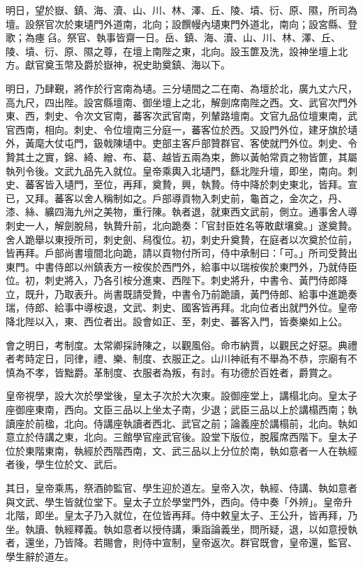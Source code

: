 \begin{pinyinscope}
 明日，望於嶽、鎮、海、瀆、山、川、林、澤、丘、陵、墳、衍、原、隰，所司為壇。設祭官次於東壝門外道南，北向；設饌幔內壝東門外道北，南向；設宮縣、登歌；為瘞臽。祭官、執事皆齋一日。岳、鎮、海、瀆、山、川、林、澤、丘、陵、墳、衍、原、隰之尊，在壇上南陛之東，北向。設玉篚及洗，設神坐壇上北方。獻官奠玉幣及爵於嶽神，祝史助奠鎮、海以下。



 明日，乃肆覲，將作於行宮南為壝。三分壝間之二在南、為壇於北，廣九丈六尺，高九尺，四出陛。設宮縣壇南、御坐壇上之北，解劍席南陛之西。文、武官次門外東、西，刺史、令次文官南，蕃客次武官南，列輦路壇南。文官九品位壇東南，武官西南，相向。刺史、令位壇南三分庭一，蕃客位於西。又設門外位，建牙旗於壝外，黃麾大仗屯門，鈒戟陳壝中。吏部主客戶部贊群官、客使就門外位。刺史、令贄其土之實，錦、綺、繒、布、葛、越皆五兩為束，飾以黃帕常貢之物皆篚，其屬執列令後。文武九品先入就位。皇帝乘輿入北壝門，繇北陛升壇，即坐，南向。刺史、蕃客皆入壝門，至位，再拜，奠贄，興，執贄。侍中降於刺史東北，皆拜。宣已，又拜。蕃客以舍人稱制如之。戶部導貢物入刺史前，龜首之，金次之，丹、漆、絲、纊四海九州之美物，重行陳。執者退，就東西文武前，側立。通事舍人導刺史一人，解劍脫舄，執贄升前，北向跪奏：「官封臣姓名等敢獻壤奠。」遂奠贄。舍人跪舉以東授所司，刺史劍、舄復位。初，刺史升奠贄，在庭者以次奠於位前，皆再拜。戶部尚書壇間北向跪，請以貢物付所司，侍中承制曰：「可。」所司受贄出東門。中書侍郎以州鎮表方一桉俟於西門外，給事中以瑞桉俟於東門外，乃就侍臣位。初，刺史將入，乃各引桉分進東、西陛下。刺史將升，中書令、黃門侍郎降立，既升，乃取表升。尚書既請受贄，中書令乃前跪讀，黃門侍郎、給事中進跪奏瑞，侍郎、給事中導桉退，文武、刺史、國客皆再拜。北向位者出就門外位。皇帝降北陛以入，東、西位者出。設會如正、至，刺史、蕃客入門，皆奏樂如上公。



 會之明日，考制度。太常卿採詩陳之，以觀風俗。命市納賈，以觀民之好惡。典禮者考時定日，同律，禮、樂、制度、衣服正之。山川神祇有不舉為不恭，宗廟有不慎為不孝，皆黜爵。革制度、衣服者為叛，有討。有功德於百姓者，爵賞之。



 皇帝視學，設大次於學堂後，皇太子次於大次東。設御座堂上，講榻北向。皇太子座御座東南，西向。文臣三品以上坐太子南，少退；武臣三品以上於講榻西南；執讀座於前楹，北向。侍講座執讀者西北、武官之前；論義座於講榻前，北向。執如意立於侍講之東，北向。三館學官座武官後。設堂下版位，脫履席西階下。皇太子位於東階東南，執經於西階西南，文、武三品以上分位於南，執如意者一人在執經者後，學生位於文、武后。



 其日，皇帝乘馬，祭酒帥監官、學生迎於道左。皇帝入次，執經、侍講、執如意者與文武、學生皆就位堂下。皇太子立於學堂門外，西向。侍中奏「外辨」。皇帝升北階，即坐。皇太子乃入就位，在位皆再拜。侍中敕皇太子、王公升，皆再拜，乃坐。執讀、執經釋義。執如意者以授侍講，秉詣論義坐，問所疑，退，以如意授執者，還坐，乃皆降。若賜會，則侍中宣制，皇帝返次。群官既會，皇帝還，監官、學生辭於道左。




\end{pinyinscope}
